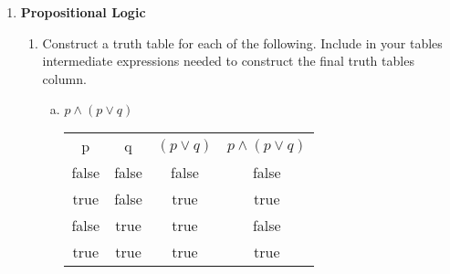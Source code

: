 \documentclass{article}
\begin{document}

    \begin{enumerate}[\bf I.]
        \item \textbf{Propositional Logic}

        \begin{enumerate}[1.]
            \item Construct a truth table for each of the following. Include in your tables intermediate expressions needed to construct the final truth tables column.

            \begin{enumerate}[a.]
                \item $p \land (p \lor q)$
                \begin{center}
                    \begin{tabular}{ |c|c|c|c| }
                        \hline
                        p & q & $(p \lor q)$ & $p \land (p \lor q)$ \\
                        false & false & false & false \\
                        true & false & true & true \\
                        false & true & true & false \\
                        true & true & true & true \\
                        \hline
                    \end{tabular}
                \end{center}


\end{enumerate}
\end{enumerate}
\end{enumerate}
\end{document}
